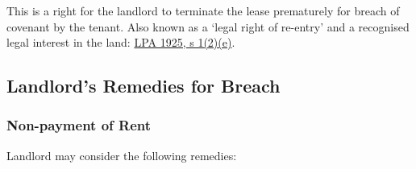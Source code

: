 \documentclass[
]{article}
\begin{document}
This is a right for the landlord to terminate the lease prematurely for
breach of covenant by the tenant. Also known as a `legal right of
re-entry' and a recognised legal interest in the land:
\href{https://www.legislation.gov.uk/ukpga/Geo5/15-16/20/section/1}{LPA
1925, s 1(2)(e)}.

\hypertarget{landlords-remedies-for-breach}{%
\subsection{Landlord's Remedies for
Breach}\label{landlords-remedies-for-breach}}

\hypertarget{non-payment-of-rent}{%
\subsubsection{Non-payment of Rent}\label{non-payment-of-rent}}

Landlord may consider the following remedies:
\end{document}
